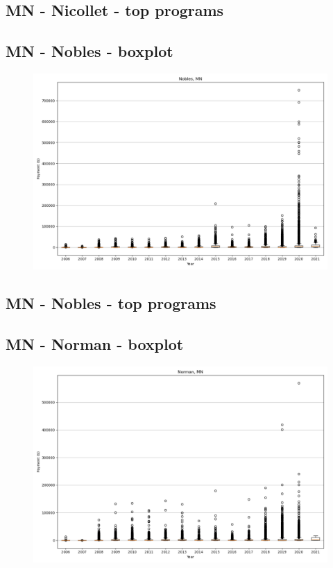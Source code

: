 \subsection*{MN - Nicollet - top programs}

\newpage
\subsection*{MN - Nobles - boxplot}
\begin{figure}[h]
\centering
\includegraphics[width=7in]{../output/boxplots/counties/Nobles-MN_boxplot.png}
\end{figure}


\subsection*{MN - Nobles - top programs}

\newpage
\subsection*{MN - Norman - boxplot}
\begin{figure}[h]
\centering
\includegraphics[width=7in]{../output/boxplots/counties/Norman-MN_boxplot.png}
\end{figure}


